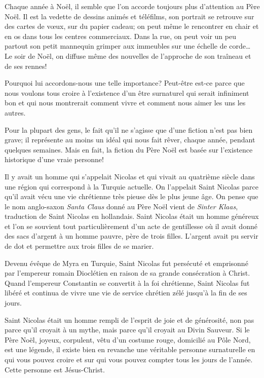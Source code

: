 
Chaque année à Noël, il semble que l'on accorde toujours plus d'attention au Père Noël. Il est la vedette de dessins animés et téléfilms, son portrait se retrouve sur des cartes de vœux, sur du papier cadeau; on peut même le rencontrer \Og en chair et en os \Fg{} dans tous les centres commerciaux. Dans la rue, on peut voir un peu partout son petit mannequin grimper aux immeubles sur une échelle de corde\dots{} Le soir de Noël, on diffuse même des nouvelles de l'approche de son traîneau et de ses rennes!

Pourquoi lui accordons-nous une telle importance? Peut-être est-ce parce que nous voulons tous croire à l'existence d'un être surnaturel qui serait infiniment bon et qui nous montrerait comment vivre et comment nous aimer les uns les autres.

Pour la plupart des gens, le fait qu'il ne s'agisse que d'une fiction n'est pas bien grave; il représente au moins un idéal qui nous fait rêver, chaque année, pendant quelques semaines. Mais en fait, la fiction du Père Noël est basée sur l'existence historique d'une vraie personne!

Il y avait un homme qui s'appelait Nicolas et qui vivait au quatrième siècle dans une région qui correspond à la Turquie actuelle. On l'appelait Saint Nicolas parce qu'il avait vécu une vie chrétienne très pieuse dès le plus jeune âge. On pense que le nom anglo-saxon \emph{Santa Claus} donné au Père Noël vient de \emph{Sinter Klaas}, traduction de \Og Saint Nicolas \Fg{} en hollandais. Saint Nicolas était un homme généreux et l'on se souvient tout particulièrement d'un acte de gentillesse où il avait donné des sacs d'argent à un homme pauvre, père de trois filles. L'argent avait pu servir de dot et permettre aux trois filles de se marier.

Devenu évêque de Myra en Turquie, Saint Nicolas fut persécuté et emprisonné par l'empereur romain Dioclétien en raison de sa grande consécration à Christ. Quand l'empereur Constantin se convertit à la foi chrétienne, Saint Nicolas fut libéré et continua de vivre une vie de service chrétien zélé jusqu'à la fin de ses jours.

Saint Nicolas était un homme rempli de l'esprit de joie et de générosité, non pas parce qu'il croyait à un mythe, mais parce qu'il croyait au Divin Sauveur. Si le Père Noël, joyeux, corpulent, vêtu d'un costume rouge, domicilié au Pôle Nord, est une légende, il existe bien en revanche une véritable personne surnaturelle en qui vous pouvez croire et sur qui vous pouvez compter tous les jours de l'année. Cette personne est Jésus-Christ.

\begin{dvquotes}
\end{dvquotes}
